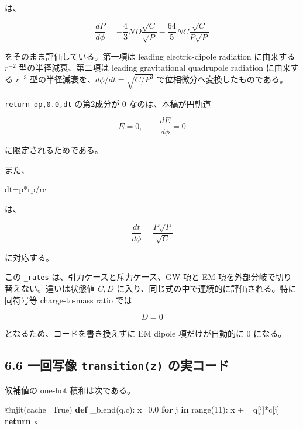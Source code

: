 \documentclass[
  a4paper,
]{ltjsarticle}
\newenvironment{Shaded}{}{}
\newcommand{\AttributeTok}[1]{\textcolor[rgb]{0.49,0.56,0.16}{#1}}
\newcommand{\BuiltInTok}[1]{\textcolor[rgb]{0.00,0.50,0.00}{#1}}
\newcommand{\ControlFlowTok}[1]{\textcolor[rgb]{0.00,0.44,0.13}{\textbf{#1}}}
\newcommand{\DecValTok}[1]{\textcolor[rgb]{0.25,0.63,0.44}{#1}}
\newcommand{\FloatTok}[1]{\textcolor[rgb]{0.25,0.63,0.44}{#1}}
\newcommand{\KeywordTok}[1]{\textcolor[rgb]{0.00,0.44,0.13}{\textbf{#1}}}
\newcommand{\NormalTok}[1]{#1}
\newcommand{\OperatorTok}[1]{\textcolor[rgb]{0.40,0.40,0.40}{#1}}
\newcommand{\VariableTok}[1]{\textcolor[rgb]{0.10,0.09,0.49}{#1}}
\begin{document}
は、

\[
\boxed{
\frac{dP}{d\phi}
=
-\frac{4}{3}ND\frac{\sqrt C}{\sqrt P}
-\frac{64}{5}NC\frac{\sqrt C}{P\sqrt P}
}
\]

をそのまま評価している。第一項は leading electric-dipole radiation
に由来する \(r^{-2}\) 型の半径減衰、第二項は leading gravitational
quadrupole radiation に由来する \(r^{-3}\)
型の半径減衰を、\(d\phi/dt=\sqrt{C/P^3}\)
で位相微分へ変換したものである。

\texttt{return\ dp,0.0,dt} の第2成分が 0 なのは、本稿が円軌道

\[
E=0,
\qquad
\frac{dE}{d\phi}=0
\]

に限定されるためである。

また、

\begin{Shaded}
\begin{Highlighting}[]
\NormalTok{dt}\OperatorTok{=}\NormalTok{p}\OperatorTok{*}\NormalTok{rp}\OperatorTok{/}\NormalTok{rc}
\end{Highlighting}
\end{Shaded}

は、

\[
\boxed{
\frac{dt}{d\phi}
=
\frac{P\sqrt P}{\sqrt C}
}
\]

に対応する。

この \texttt{\_rates} は、引力ケースと斥力ケース、GW 項と EM
項を外部分岐で切り替えない。違いは状態値 \(C,D\)
に入り、同じ式の中で連続的に評価される。特に同符号等 charge-to-mass
ratio では

\[
D=0
\]

となるため、コードを書き換えずに EM dipole 項だけが自動的に 0 になる。

\subsection{\texorpdfstring{6.6 一回写像 \texttt{transition(z)}
の実コード}{6.6 一回写像 transition(z) の実コード}}\label{ux4e00ux56deux5199ux50cf-transitionz-ux306eux5b9fux30b3ux30fcux30c9}

候補値の one-hot 積和は次である。

\begin{Shaded}
\begin{Highlighting}[]
\AttributeTok{@njit}\NormalTok{(cache}\OperatorTok{=}\VariableTok{True}\NormalTok{)}
\KeywordTok{def}\NormalTok{ \_blend(q,c):}
\NormalTok{    x}\OperatorTok{=}\FloatTok{0.0}
    \ControlFlowTok{for}\NormalTok{ j }\KeywordTok{in} \BuiltInTok{range}\NormalTok{(}\DecValTok{11}\NormalTok{): x }\OperatorTok{+=}\NormalTok{ q[j]}\OperatorTok{*}\NormalTok{c[j]}
    \ControlFlowTok{return}\NormalTok{ x}
\end{Highlighting}
\end{Shaded}
\end{document}
